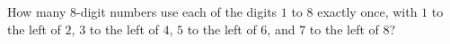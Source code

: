 How many $8$-digit numbers use each of the digits $1$ to $8$ exactly once, with $1$ to the left of $2$, $3$ to the left of $4$, $5$ to the left of $6$, and $7$ to the left of $8$?
